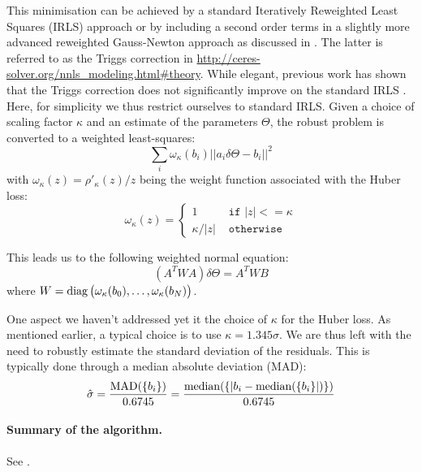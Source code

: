This minimisation can be achieved by a standard Iteratively Reweighted Least Squares (IRLS) approach \cite{Green:JRSSB:1984} or by including a second order terms in a slightly more advanced reweighted Gauss-Newton approach as discussed in \cite{Triggs:VisAlg:2000}.
The latter is referred to as the Triggs correction in \url{http://ceres-solver.org/nnls_modeling.html#theory}. While elegant, previous work has shown that the Triggs correction does not significantly improve on the standard IRLS \cite{Zach:ECCV:2014,Zach:ECCV:2018}.
Here, for simplicity we thus restrict ourselves to standard IRLS.
Given a choice of scaling factor $\kappa$ and an estimate of the parameters $\Theta$, the robust problem is converted to a weighted least-squares:
\begin{equation}
\sum_i \omega_\kappa(b_i) ||a_i \delta\Theta - b_i||^2
\end{equation}
with $\omega_\kappa(z) = \rho'_\kappa(z) / z$ being the weight function associated with the Huber loss:
\begin{equation}
\omega_\kappa(z) =
\begin{cases}
  1 &\texttt{ if } |z| <= \kappa \\
  \kappa / |z|  &\texttt{ otherwise }
\end{cases}
\end{equation}

This leads us to the following weighted normal equation:
\begin{equation}
(A^T W A) \delta\Theta = A^T W B
\end{equation}
where $W = \operatorname{diag}\big(\omega_\kappa(b_0), \ldots, \omega_\kappa(b_N)\big)$.

One aspect we haven't addressed yet it the choice of $\kappa$ for the Huber loss. As mentioned earlier, a typical choice is to use $\kappa=1.345\sigma$. We are thus left with the need to robustly estimate the standard deviation of the residuals. This is typically done through a median absolute deviation (MAD):
\begin{equation}
\hat{\sigma} = \frac{\operatorname{MAD}(\{b_i\})}{0.6745} = \frac{\operatorname{median}(\{|b_i-\operatorname{median}(\{b_i\}|)\})}{0.6745}
\end{equation}

\paragraph{Summary of the algorithm.}
See .

